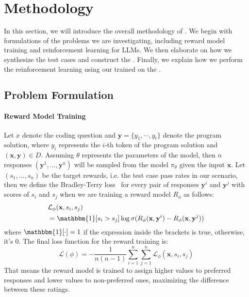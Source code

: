\section{Methodology}
\label{sec:methodology}

In this section, we will introduce the overall methodology of \coder. We begin with formulations of the problems we are investigating, including reward model training and reinforcement learning for LLMs. We then elaborate on how we synthesize the test cases and construct the \dataset{}. Finally, we explain how we perform the reinforcement learning using our \RM trained on the \dataset{}.

\subsection{Problem Formulation}
\label{subsec:problem_formulation}
\paragraph{Reward Model Training}
Let $x$ denote the coding question and $\mathbf{y} = \{y_1, \cdots, y_t\}$ denote the program solution, where $y_i$ represents the $i$-th token of the program solution and $(\mathbf{x},\mathbf{y}) \in D$. Assuming $\theta$ represents the parameters of the model, then $n$ responses $(\mathbf{y}^1, ..., \mathbf{y}^n)$ will be sampled from the model $\pi_{\theta}$ given the input $\mathbf{x}$. Let $(s_1, ..., s_n)$ be the target rewards, i.e. the test case pass rates in our scenario, then we define the Bradley-Terry loss~\citep{Bradley1952RankAO} for every pair of responses $\mathbf{y}^i$ and $\mathbf{y}^j$ with scores of $s_i$ and $s_j$ when we are training a reward model $R_\phi$ as follows:
\begin{equation*}
\begin{split}
    &\mathcal{L}_\phi(\mathbf{x},s_i,s_j) \\
    & = \mathbbm{1}[s_i > s_j]\log{\sigma(R_\phi(\mathbf{x}, \mathbf{y}^i) - R_\phi(\mathbf{x}, \mathbf{y}^j))}
\end{split}
\end{equation*}
where $\mathbbm{1}[\cdot]=1$ if the expression inside the brackets is true, otherwise, it's 0. The final loss function for the reward training is:
\begin{equation}
\label{eq:rm_loss}
\mathcal{L}(\phi) = -\frac{1}{n(n-1)}\sum_{i=1}^n\sum_{j=1}^n \mathcal{L}_\phi(\mathbf{x},s_i,s_j)
\end{equation}
That means the reward model is trained to assign higher values to preferred responses and lower values to non-preferred ones, maximizing the difference between these ratings.

